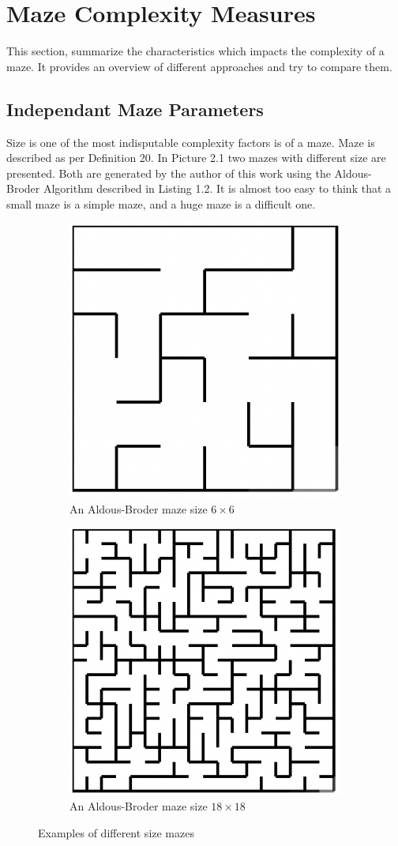 \section{Maze Complexity Measures}
This section, summarize the characteristics which impacts the complexity of a maze. It provides an overview of different approaches and try to compare them. 
\subsection{Independant Maze Parameters}
Size is one of the most indisputable complexity factors is of a maze. Maze is described as per Definition 20.\textcolor{}{ In Picture 2.1 two mazes with different size are presented. Both are generated by the author of this work using the Aldous-Broder Algorithm described in Listing 1.2.} It is almost too easy to think that a small maze is a simple maze, and a huge maze is a difficult one.
\begin{figure}[!h]
    \centering
    \begin{subfigure}{.5\textwidth}
    \centering
    \includegraphics[width=.5\linewidth]{66}
    \caption{An Aldous-Broder maze size $6 \times 6$}
\label{fig:sub1}
    \end{subfigure}%
    \begin{subfigure}{.5\textwidth}
    \centering
    \includegraphics[width=.5\linewidth]{1818}
    \caption{An Aldous-Broder maze size $18 \times 18$}
\label{fig:sub2}
    \end{subfigure}
    \caption{Examples of different size mazes}
\label{fig:test}
\end{figure}
